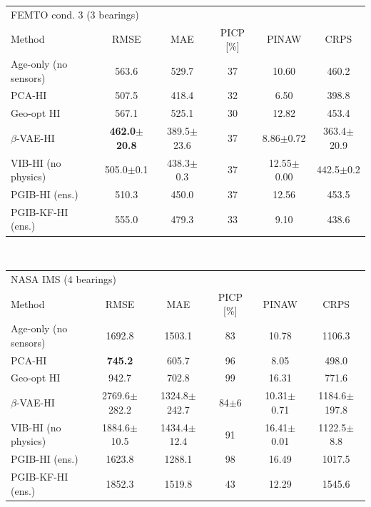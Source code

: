 \begin{tabular}{l c c c c c}
\hline
\multicolumn{6}{l}{FEMTO cond. 3 (3 bearings)}\\
 Method & RMSE & MAE & PICP [\%] & PINAW & CRPS \\
\hline
Age-only (no sensors) & 563.6 & 529.7 & 37 & 10.60 & 460.2 \\
PCA-HI & 507.5 & 418.4 & 32 & 6.50 & 398.8 \\
Geo-opt HI & 567.1 & 525.1 & 30 & 12.82 & 453.4 \\
$\beta$-VAE-HI & \textbf{462.0$\pm$20.8} & 389.5$\pm$23.6 & 37 & 8.86$\pm$0.72 & 363.4$\pm$20.9 \\
VIB-HI (no physics) & 505.0$\pm$0.1 & 438.3$\pm$0.3 & 37 & 12.55$\pm$0.00 & 442.5$\pm$0.2 \\
PGIB-HI (ens.) & 510.3 & 450.0 & 37 & 12.56 & 453.5 \\
PGIB-KF-HI (ens.) & 555.0 & 479.3 & 33 & 9.10 & 438.6 \\
\hline
\end{tabular}
\\[4pt]
\begin{tabular}{l c c c c c}
\hline
\multicolumn{6}{l}{NASA IMS (4 bearings)}\\
 Method & RMSE & MAE & PICP [\%] & PINAW & CRPS \\
\hline
Age-only (no sensors) & 1692.8 & 1503.1 & 83 & 10.78 & 1106.3 \\
PCA-HI & \textbf{745.2} & 605.7 & 96 & 8.05 & 498.0 \\
Geo-opt HI & 942.7 & 702.8 & 99 & 16.31 & 771.6 \\
$\beta$-VAE-HI & 2769.6$\pm$282.2 & 1324.8$\pm$242.7 & 84$\pm$6 & 10.31$\pm$0.71 & 1184.6$\pm$197.8 \\
VIB-HI (no physics) & 1884.6$\pm$10.5 & 1434.4$\pm$12.4 & 91 & 16.41$\pm$0.01 & 1122.5$\pm$8.8 \\
PGIB-HI (ens.) & 1623.8 & 1288.1 & 98 & 16.49 & 1017.5 \\
PGIB-KF-HI (ens.) & 1852.3 & 1519.8 & 43 & 12.29 & 1545.6 \\
\hline
\end{tabular}
